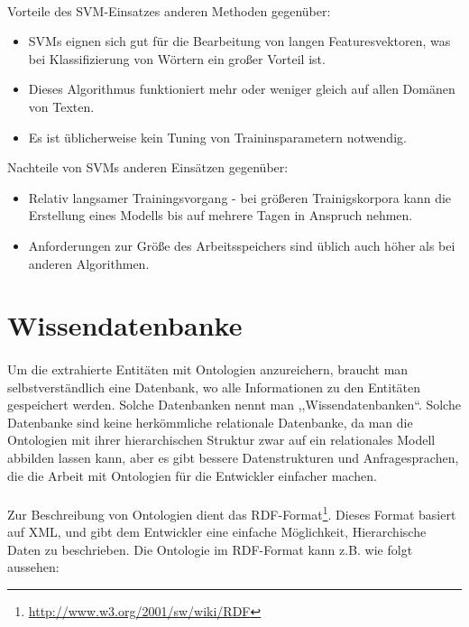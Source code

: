 \paragraph{}
Vorteile des SVM-Einsatzes anderen Methoden gegenüber\cite{joachims1998text}:
\begin{itemize}
\item SVMs eignen sich gut für die Bearbeitung von langen Featuresvektoren, was bei Klassifizierung von Wörtern ein großer Vorteil ist.
\item Dieses Algorithmus funktioniert mehr oder weniger gleich auf allen Domänen von Texten.
\item Es ist üblicherweise kein Tuning von Traininsparametern notwendig.
\end{itemize}

Nachteile von SVMs anderen Einsätzen gegenüber:
\begin{itemize}
\item Relativ langsamer Trainingsvorgang - bei größeren Trainigskorpora kann die Erstellung eines Modells bis auf mehrere Tagen in Anspruch nehmen.
\item Anforderungen zur Größe des Arbeitsspeichers sind üblich auch höher als bei anderen Algorithmen.
\end{itemize}

\section{Wissendatenbanke}
\paragraph{}
Um die extrahierte Entitäten mit Ontologien anzureichern, braucht man selbstverständlich eine Datenbank, wo alle Informationen zu den Entitäten gespeichert werden. Solche Datenbanken nennt man ,,Wissendatenbanken``. Solche Datenbanke sind keine herkömmliche relationale Datenbanke, da man die Ontologien mit ihrer hierarchischen Struktur zwar auf ein relationales Modell abbilden lassen kann, aber es gibt bessere Datenstrukturen und Anfragesprachen, die die Arbeit mit Ontologien für die Entwickler einfacher machen.

\paragraph{}
Zur Beschreibung von Ontologien dient das RDF-Format\footnote{\url{http://www.w3.org/2001/sw/wiki/RDF}}. Dieses Format basiert auf XML, und gibt dem Entwickler eine einfache Möglichkeit, Hierarchische Daten zu beschrieben. Die Ontologie im RDF-Format kann z.B. wie folgt aussehen:
\lstset{language=XML}


